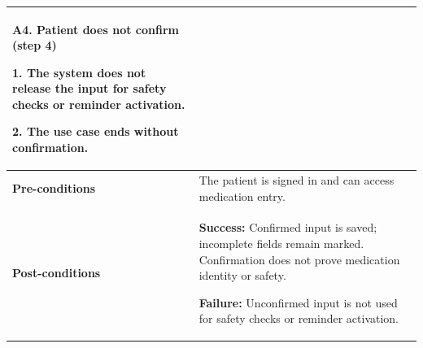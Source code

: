 \begin{longtable}{|p{}|p{}|}
\textbf{A4. Patient does not confirm (step 4)}\par
1. The system does not release the input for safety checks or reminder activation.\par
2. The use case ends without confirmation.
\\ \hline
\textbf{Pre-conditions} & The patient is signed in and can access medication entry. \\ \hline
\textbf{Post-conditions} & \textbf{Success:} Confirmed input is saved; incomplete fields remain marked. Confirmation does not prove medication identity or safety.\par
\textbf{Failure:} Unconfirmed input is not used for safety checks or reminder activation. \\ \hline
\end{longtable}

